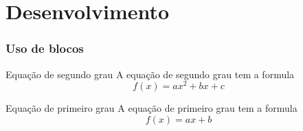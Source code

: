 \documentclass{beamer}
\begin{document}
\section{Desenvolvimento}
\begin{frame}
  \frametitle{Uso de blocos}
  \begin{block}{Equação de segundo grau}
    A equação de segundo grau tem a formula
    \begin{displaymath}
      f(x) = ax^2+bx+c
    \end{displaymath}
  \end{block}
  \begin{block}{Equação de primeiro grau}
    A equação de primeiro grau tem a formula
    \begin{displaymath}
      f(x) = ax+b
    \end{displaymath}
  \end{block}
\end{frame}

\begin{frame}[fragile]
    
\end{frame}
\end{document}
